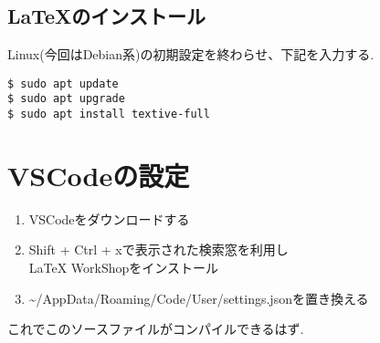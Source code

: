 \documentclass[a4j,12pt]{jreport}
\begin{document}
            \subsection{\LaTeX のインストール}
                Linux(今回はDebian系)の初期設定を終わらせ、下記を入力する.
                \begin{lstlisting}[caption=Linuxのターミナル,label=bash]
$ sudo apt update
$ sudo apt upgrade
$ sudo apt install textive-full
                \end{lstlisting}
                

        \section{VSCodeの設定}

            
            \begin{enumerate}
                \item VSCodeをダウンロードする\cite{vscode}
                
                \item Shift + Ctrl + xで表示された検索窓を利用し \\
                LaTeX WorkShopをインストール
                
                \item \textasciitilde /AppData/Roaming/Code/User/settings.jsonを置き換える\cite{wsl}
            
            \end{enumerate}

            これでこのソースファイルがコンパイルできるはず.

    
\end{document}

